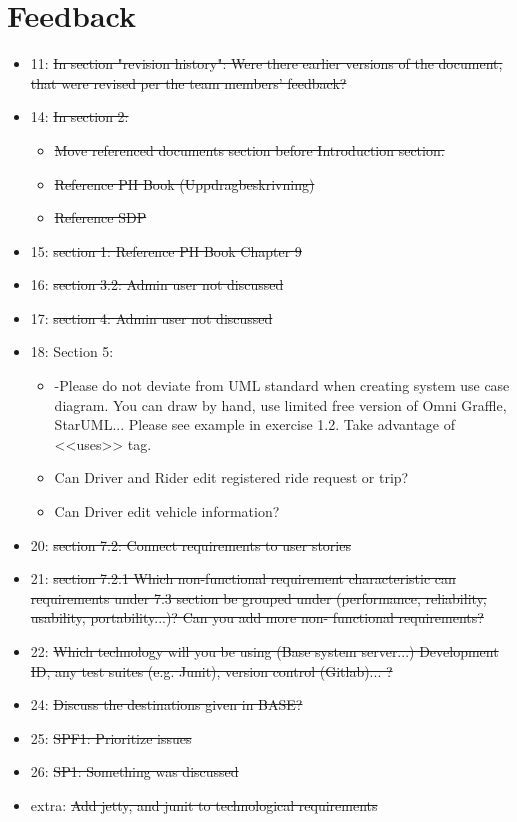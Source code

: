 \documentclass{article}
\begin{document}
\section*{Feedback}
\begin{itemize}
    \item 11: \sout{In section "revision history": Were there earlier versions of the document, that were revised per the team members' feedback?}
    \item 14: \sout{In section 2:}
    \begin{itemize}
        \item \sout{Move referenced documents section before Introduction section.}
        \item \sout{Reference PH Book (Uppdragbeskrivning)}
        \item \sout{Reference SDP}
    \end{itemize}
    \item 15: \sout{section 1: Reference PH Book Chapter 9}
    \item 16: \sout{section 3.2: Admin user not discussed}
    \item 17: \sout{section 4: Admin user not discussed}
    \item 18: Section 5:
    \begin{itemize}
        \item -Please do not deviate from UML standard when creating system use case diagram. You can draw by hand, use limited free version of Omni Graffle, StarUML... Please see example in exercise 1.2. Take advantage of <<uses>> tag.
        \item Can Driver and Rider edit registered ride request or trip?
        \item Can Driver edit vehicle information?
    \end{itemize}
    \item 20: \sout{section 7.2: Connect requirements to user stories}
    \item 21: \sout{section 7.2.1 Which non-functional requirement characteristic can requirements under 7.3 section be grouped under (performance, reliability, usability, portability...)? Can you add more non- functional requirements?}
    \item 22: \sout{Which technology will you be using (Base system server...) Development ID, any test suites (e.g. Junit), version control (Gitlab)... ?}
    \item 24: \sout{Discuss the destinations given in BASE?}
    \item 25: \sout{SPF1: Prioritize issues}
    \item 26: \sout{SP1: Something was discussed}
    \item extra: \sout{Add jetty, and junit to technological requirements}
\end{itemize}
\end{document}
